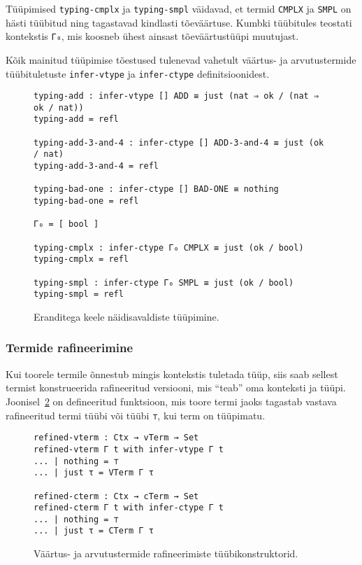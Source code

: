 \documentclass[a4paper,12pt]{article}
\begin{document}
Tüüpimised {\tt typing-cmplx} ja {\tt typing-smpl} väidavad, et termid {\tt CMPLX} ja {\tt SMPL} on hästi tüübitud ning tagastavad kindlasti tõeväärtuse. Kumbki tüübitules teostati kontekstis {\tt Γ₀}, mis koosneb ühest ainsast tõeväärtustüüpi muutujast.

Kõik mainitud tüüpimise tõestused tulenevad vahetult väärtus- ja arvutustermide tüübituletuste {\tt infer-vtype} ja {\tt infer-ctype} definitsioonidest.

\begin{figure}
  \begin{BVerbatim}
typing-add : infer-vtype [] ADD ≡ just (nat ⇒ ok / (nat ⇒ ok / nat))
typing-add = refl

typing-add-3-and-4 : infer-ctype [] ADD-3-and-4 ≡ just (ok / nat)
typing-add-3-and-4 = refl

typing-bad-one : infer-ctype [] BAD-ONE ≡ nothing
typing-bad-one = refl

Γ₀ = [ bool ]

typing-cmplx : infer-ctype Γ₀ CMPLX ≡ just (ok / bool)
typing-cmplx = refl

typing-smpl : infer-ctype Γ₀ SMPL ≡ just (ok / bool)
typing-smpl = refl
  \end{BVerbatim}
  \caption{Eranditega keele näidisavaldiste tüüpimine.}
  \label{fig:exc.typing}
\end{figure}

\subsubsection{Termide rafineerimine}

Kui toorele termile õnnestub mingis kontekstis tuletada tüüp, siis saab sellest termist konstrueerida rafineeritud versiooni, mis ``teab'' oma konteksti ja tüüpi.
Joonisel~\ref{fig:exc.infer-term-type} on defineeritud funktsioon, mis toore termi jaoks tagastab vastava rafineeritud termi tüübi või tüübi {\tt ⊤}, kui term on tüüpimatu.
\begin{figure}
  \begin{BVerbatim}
refined-vterm : Ctx → vTerm → Set
refined-vterm Γ t with infer-vtype Γ t 
... | nothing = ⊤
... | just τ = VTerm Γ τ

refined-cterm : Ctx → cTerm → Set
refined-cterm Γ t with infer-ctype Γ t 
... | nothing = ⊤
... | just τ = CTerm Γ τ
  \end{BVerbatim}
  \caption{Väärtus- ja arvutustermide rafineerimiste tüübikonstruktorid.}
  \label{fig:exc.infer-term-type}
\end{figure}
\end{document}
